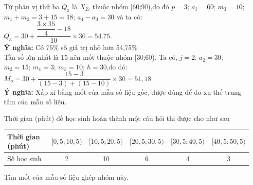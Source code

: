 \begin{ex}
{		Tứ phân vị thứ  ba $Q_{3}$ là $X_{27}$ thuộc nhóm [60;90),do đó $p=3$; $a_{3}=60$; $m_{3}=10$; $m_{1}+m_{2}=3+15=18$; $a_{4}-a_{3}=30$ và ta có:
		$Q_{3}=30+\dfrac{\dfrac{3 \times  35}{4}-18}{10} \times 30=54.75$.\\
		 \textbf{Ý nghĩa:} Có $75 \%$ số giá trị nhỏ hơn 54{,}75\% \\
		Tần số lớn nhất là 15 nên mốt thuộc nhóm [30;60). Ta có, $j=2$; $a_{2}=30$; $m_{2}=15$; $m_{1}=3$;  $m_{3}=10$; $h=30$,do dó: $M_{o}=30+\dfrac{15-3}{(15-3)+(15-10)} \times 30=51{,}18$\\
		\textbf{ Ý nghĩa:} Xấp xỉ bằng mốt của mẫu số liệu gốc, được dùng để đo xu thế trung tâm của mẫu số liệu. 
	 }
\end{ex}

\begin{ex}%
	Thời gian (phút) đề học sinh hoàn thành một câu hỏi thi được  cho như sau
	\begin{center}
		\begin{tabular}{|l|c|c|c|c|c|}
			\hline Thời gian (phút) & $[0{,}5;10{,}5)$ & $[10{,}5;20{,}5)$ &  $[20{,}5;30{,}5)$ & $[30{,}5;40{,}5)$ & $[40{,}5;50{,}5)$ \\
			\hline Số học sinh & 2 & 10 & 6 & 4  & 3 \\
			 \hline
		\end{tabular}
	\end{center}
	Tìm mốt của mẫu số liệu ghép nhóm  này.
\end{ex}

